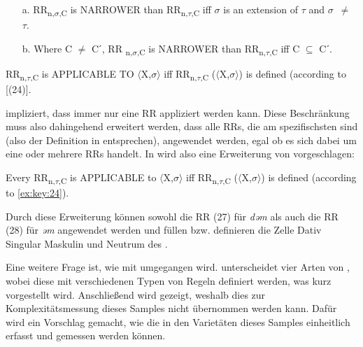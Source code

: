 \begin{exe}
\begin{itemize}
\item[a.] RR\textsubscript{n,}\textsubscript{$\sigma $}\textsubscript{,C} is NARROWER than RR\textsubscript{n,}\textsubscript{$\tau $}\textsubscript{,C} iff $\sigma $ is an extension of $\tau $ and \mbox{$\sigma $ ${\neq}$ $\tau $}.
\item[b.] Where C ${\neq}$ Cˊ, RR \textsubscript{n,}\textsubscript{$\sigma $}\textsubscript{,C} is NARROWER than RR\textsubscript{n,}\textsubscript{$\tau $}\textsubscript{,C} iff C ${\subseteq}$ Cˊ. \citep[52]{Stump2001}
\end{itemize}
\z

\begin{exe}
RR\textsubscript{n,}\textsubscript{$\tau $}\textsubscript{,C} is APPLICABLE TO $\langle$X,$\sigma$$\rangle$ iff RR\textsubscript{n,}\textsubscript{$\tau $}\textsubscript{,C} ($\langle$X,$\sigma$$\rangle$) is defined (according to [(24)]. \citep[52]{Stump2001}
\z

\noindent        
{} impliziert, dass immer nur eine RR appliziert werden kann. Diese Beschränkung muss also dahingehend erweitert werden, dass alle RRs, die am spezifischsten sind (also der Definition in  entsprechen), angewendet werden, egal ob es sich dabei um eine oder mehrere RRs handelt. In  wird also eine Erweiterung von  vorgeschlagen:

\ea%
    \label{ex:key:29}
Every RR\textsubscript{n,}\textsubscript{$\tau $}\textsubscript{,C} is APPLICABLE to $\langle$X,$\sigma$$\rangle$ iff RR\textsubscript{n,}\textsubscript{$\tau $}\textsubscript{,C} ($\langle$X,$\sigma$$\rangle$) is defined (according to \ref{ex:key:24}).

    \z
\noindent
Durch diese Erweiterung können sowohl die RR (27) für \textit{dəm} als auch die RR (28) für \textit{əm} angewendet werden und füllen bzw. definieren die Zelle Dativ Singular Maskulin und Neutrum des .

Eine weitere Frage ist, wie mit  umgegangen wird. \citet{Stump2001} unterscheidet vier Arten von , wobei diese mit verschiedenen Typen von Regeln definiert werden, was kurz vorgestellt wird. Anschließend wird gezeigt, weshalb dies zur Komplexitätsmessung dieses Samples nicht übernommen werden kann. Dafür wird ein Vorschlag gemacht, wie die  in den Varietäten dieses Samples einheitlich erfasst und gemessen werden können.\\


\end{exe}
\end{exe}
